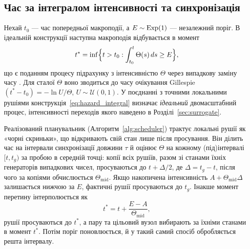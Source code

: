 \subsection{Час за інтегралом інтенсивності та синхронізація}
\label{sec:timing}

Нехай $t_0$ --- час попередньої макроподії, а $E\sim\mathrm{Exp}(1)$ --- незалежний поріг. В ідеальній конструкції наступна макроподія відбувається в момент
\begin{equation}
\label{eq:hazard_integral}
t^\ast=\inf\Bigl\{t>t_0:\int_{t_0}^{t}\Theta(s)\,ds\ge E\Bigr\},
\end{equation}
що є поданням процесу підрахунку з інтенсивністю $\Theta$ через випадкову заміну часу \citep{ethier1986,anderson2007}. Для сталої $\Theta$ воно зводиться до часу очікування Gillespie $(t^\ast-t_0)=-\ln U/\Theta$, $U\sim\mathcal{U}(0,1)$. У поєднанні з точними локальними рушіями конструкція~\eqref{eq:hazard_integral} визначає \emph{ідеальний} двомасштабний процес, інтенсивності переходів якого наведено в Розділі~\ref{sec:surrogate}.

Реалізований планувальник (Алгоритм~\ref{alg:scheduler}) трактує локальні рушії як «чорні скриньки», що відкривають свій стан лише після просування. Він ділить час на інтервали синхронізації довжини $\tau$ й оцінює $\Theta$ на кожному (під)інтервалі $[t,t_g)$ за пробою в середній точці: копії всіх рушіїв, разом зі станами їхніх генераторів випадкових чисел, просуваються до $t+\Delta/2$, де $\Delta=t_g-t$, після чого за копіями обчислюється $\Theta_{\mathrm{mid}}$. Якщо накопичена інтенсивність $A+\Theta_{\mathrm{mid}}\Delta$ залишається нижчою за $E$, фактичні рушії просуваються до $t_g$. Інакше момент перетину інтерполюється як
\begin{equation}
\label{eq:interpolation}
t^\ast=t+\frac{E-A}{\Theta_{\mathrm{mid}}},
\end{equation}
рушії просуваються до $t^\ast$, а пару та цільовий вузол вибирають за їхніми станами в момент $t^\ast$. Потім поріг поновлюється, й у такий самий спосіб обробляється решта інтервалу.

